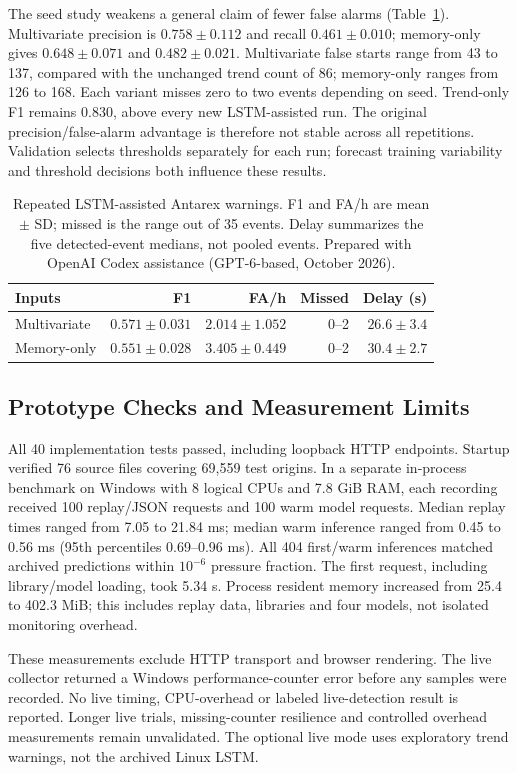 The seed study weakens a general claim of fewer false alarms (Table~\ref{tab:repeat_warning}). Multivariate precision is $0.758\pm0.112$ and recall $0.461\pm0.010$; memory-only gives $0.648\pm0.071$ and $0.482\pm0.021$. Multivariate false starts range from 43 to 137, compared with the unchanged trend count of 86; memory-only ranges from 126 to 168. Each variant misses zero to two events depending on seed. Trend-only F1 remains 0.830, above every new LSTM-assisted run. The original precision/false-alarm advantage is therefore not stable across all repetitions. Validation selects thresholds separately for each run; forecast training variability and threshold decisions both influence these results.


\begin{table}[htbp]
\caption{Repeated LSTM-assisted Antarex warnings. F1 and FA/h are mean $\pm$ SD; missed is the range out of 35 events. Delay summarizes the five detected-event medians, not pooled events. Prepared with OpenAI Codex assistance (GPT-6-based, October 2026).}
\label{tab:repeat_warning}
\centering\small
\setlength{\tabcolsep}{4pt}
\begin{tabular}{@{}lrrrr@{}}
\toprule
Inputs & F1 & FA/h & Missed & Delay (s)\\
\midrule
Multivariate & $0.571\pm0.031$ & $2.014\pm1.052$ & 0--2 & $26.6\pm3.4$\\
Memory-only & $0.551\pm0.028$ & $3.405\pm0.449$ & 0--2 & $30.4\pm2.7$\\
\bottomrule
\end{tabular}
\end{table}


\clearpage
\subsection{Prototype Checks and Measurement Limits}
All 40 implementation tests passed, including loopback HTTP endpoints. Startup verified 76 source files covering 69,559 test origins. In a separate in-process benchmark on Windows with 8 logical CPUs and 7.8 GiB RAM, each recording received 100 replay/JSON requests and 100 warm model requests. Median replay times ranged from 7.05 to 21.84 ms; median warm inference ranged from 0.45 to 0.56 ms (95th percentiles 0.69--0.96 ms). All 404 first/warm inferences matched archived predictions within $10^{-6}$ pressure fraction. The first request, including library/model loading, took 5.34 s. Process resident memory increased from 25.4 to 402.3 MiB; this includes replay data, libraries and four models, not isolated monitoring overhead.

These measurements exclude HTTP transport and browser rendering. The live collector returned a Windows performance-counter error before any samples were recorded. No live timing, CPU-overhead or labeled live-detection result is reported. Longer live trials, missing-counter resilience and controlled overhead measurements remain unvalidated. The optional live mode uses exploratory trend warnings, not the archived Linux LSTM.
